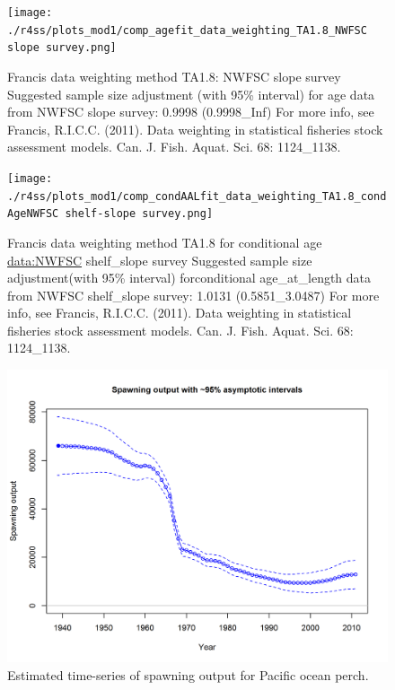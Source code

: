 \documentclass[12pt,]{article}
\begin{document}
\begin{figure}
\centering
\texttt{[image: ./r4ss/plots\_mod1/comp\_agefit\_data\_weighting\_TA1.8\_NWFSC slope survey.png]}
\caption{Francis data weighting method TA1.8: NWFSC slope survey
Suggested sample size adjustment (with 95\% interval) for age data from
NWFSC slope survey: 0.9998 (0.9998\_Inf) For more info, see Francis,
R.I.C.C. (2011). Data weighting in statistical fisheries stock
assessment models. Can. J. Fish. Aquat. Sci. 68: 1124\_1138.
\label{fig:weighting_nwfscslope}}
\end{figure}

\begin{figure}
\centering
\texttt{[image: ./r4ss/plots\_mod1/comp\_condAALfit\_data\_weighting\_TA1.8\_condAgeNWFSC shelf-slope survey.png]}
\caption{Francis data weighting method TA1.8 for conditional age
\url{data:NWFSC} shelf\_slope survey Suggested sample size
adjustment(with 95\% interval) forconditional age\_at\_length data from
NWFSC shelf\_slope survey: 1.0131 (0.5851\_3.0487) For more info, see
Francis, R.I.C.C. (2011). Data weighting in statistical fisheries stock
assessment models. Can. J. Fish. Aquat. Sci. 68: 1124\_1138.
\label{fig:weighting_nwfsccombo}}
\end{figure}

\FloatBarrier

\begin{figure}
\centering
\includegraphics{r4ss/plots_mod1/ts7_Spawning_output_with_95_asymptotic_intervals_intervals.png}
\caption{Estimated time-series of spawning output for Pacific ocean
perch. \label{fig:ssb}}
\end{figure}
\end{document}

